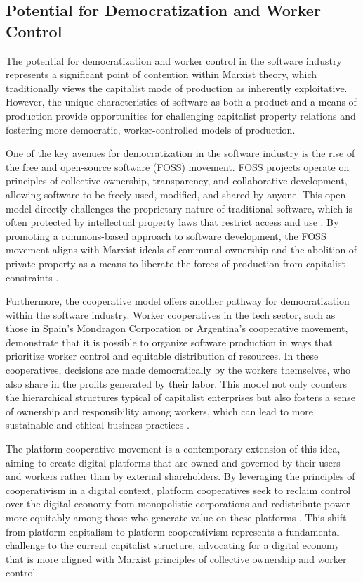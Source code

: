 \begin{refsection}
\subsection{Potential for Democratization and Worker Control}

The potential for democratization and worker control in the software industry represents a significant point of contention within Marxist theory, which traditionally views the capitalist mode of production as inherently exploitative. However, the unique characteristics of software as both a product and a means of production provide opportunities for challenging capitalist property relations and fostering more democratic, worker-controlled models of production.

One of the key avenues for democratization in the software industry is the rise of the free and open-source software (FOSS) movement. FOSS projects operate on principles of collective ownership, transparency, and collaborative development, allowing software to be freely used, modified, and shared by anyone. This open model directly challenges the proprietary nature of traditional software, which is often protected by intellectual property laws that restrict access and use \cite[pp.~36-39]{stallman2010free}. By promoting a commons-based approach to software development, the FOSS movement aligns with Marxist ideals of communal ownership and the abolition of private property as a means to liberate the forces of production from capitalist constraints \cite[pp.~92-94]{bollier2014commons}.

Furthermore, the cooperative model offers another pathway for democratization within the software industry. Worker cooperatives in the tech sector, such as those in Spain’s Mondragon Corporation or Argentina’s cooperative movement, demonstrate that it is possible to organize software production in ways that prioritize worker control and equitable distribution of resources. In these cooperatives, decisions are made democratically by the workers themselves, who also share in the profits generated by their labor. This model not only counters the hierarchical structures typical of capitalist enterprises but also fosters a sense of ownership and responsibility among workers, which can lead to more sustainable and ethical business practices \cite[pp.~125-127]{schneider2018everything}.

The platform cooperative movement is a contemporary extension of this idea, aiming to create digital platforms that are owned and governed by their users and workers rather than by external shareholders. By leveraging the principles of cooperativism in a digital context, platform cooperatives seek to reclaim control over the digital economy from monopolistic corporations and redistribute power more equitably among those who generate value on these platforms \cite[pp.~45-48]{scholz2016platform}. This shift from platform capitalism to platform cooperativism represents a fundamental challenge to the current capitalist structure, advocating for a digital economy that is more aligned with Marxist principles of collective ownership and worker control.


\end{refsection}
